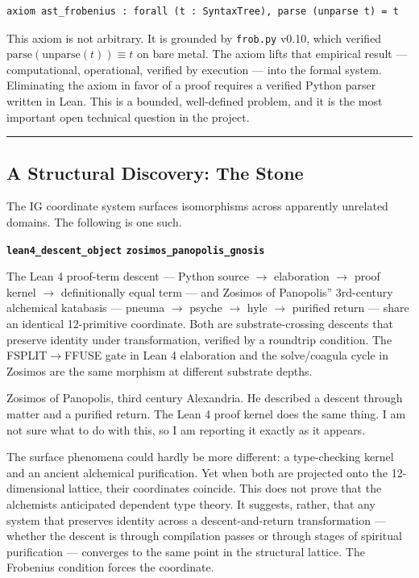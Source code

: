 \documentclass[12pt,a4paper]{article}
\begin{document}
\begin{lstlisting}[language=lean]
axiom ast_frobenius : forall (t : SyntaxTree), parse (unparse t) = t
\end{lstlisting}

This axiom is not arbitrary. It is grounded by \texttt{frob.py} v0.10, which verified $\text{parse}(\text{unparse}(t)) \equiv t$ on bare metal. The axiom lifts that empirical result --- computational, operational, verified by execution --- into the formal system. Eliminating the axiom in favor of a proof requires a verified Python parser written in Lean. This is a bounded, well-defined problem, and it is the most important open technical question in the project.

\begin{center}
\rule{0.5\textwidth}{0.4pt}
\end{center}

\subsection{A Structural Discovery: The Stone}

The IG coordinate system surfaces isomorphisms across apparently unrelated domains. The following is one such.

\textbf{\texttt{lean4\_descent\_object} \equiv \texttt{zosimos\_panopolis\_gnosis}}

The Lean 4 proof-term descent --- Python source $\rightarrow$ elaboration $\rightarrow$ proof kernel $\rightarrow$ definitionally equal term --- and Zosimos of Panopolis'' 3rd-century alchemical katabasis --- pneuma $\rightarrow$ psyche $\rightarrow$ hyle $\rightarrow$ purified return --- share an identical 12-primitive coordinate. Both are substrate-crossing descents that preserve identity under transformation, verified by a roundtrip condition. The FSPLIT$\rightarrow$FFUSE gate in Lean 4 elaboration and the solve/coagula cycle in Zosimos are the same morphism at different substrate depths.

Zosimos of Panopolis, third century Alexandria. He described a descent through matter and a purified return. The Lean 4 proof kernel does the same thing. I am not sure what to do with this, so I am reporting it exactly as it appears.

The surface phenomena could hardly be more different: a type-checking kernel and an ancient alchemical purification. Yet when both are projected onto the 12-dimensional lattice, their coordinates coincide. This does not prove that the alchemists anticipated dependent type theory. It suggests, rather, that any system that preserves identity across a descent-and-return transformation --- whether the descent is through compilation passes or through stages of spiritual purification --- converges to the same point in the structural lattice. The Frobenius condition forces the coordinate.
\end{document}
